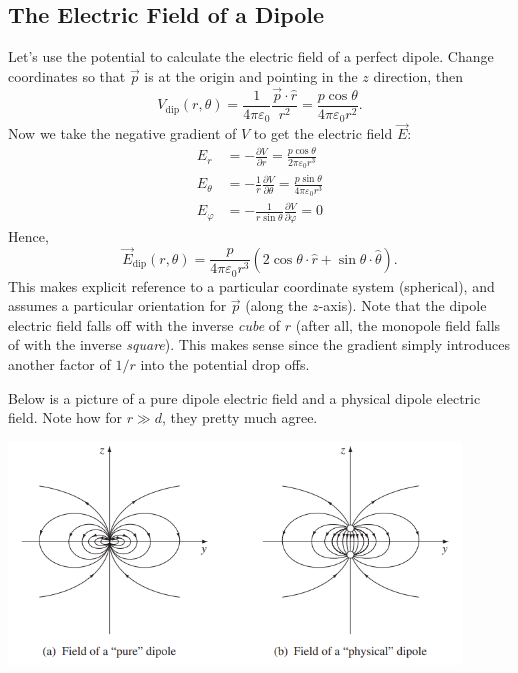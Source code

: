 \subsection{The Electric Field of a Dipole}

Let's use the potential to calculate the electric field of a perfect dipole. Change coordinates so that $\vec{p}$ is at the origin and pointing in the $z$ direction, then 
\[V_{\text{dip}}(r,\theta)=\frac{1}{4\pi\varepsilon_0}\frac{\vec{p}\cdot \hat{r}}{r^2}=\frac{p\cos\theta}{4\pi\varepsilon_0r^2}.\]
Now we take the negative gradient of $V$ to get the electric field $\vec{E}$:
\begin{align*}
    E_r&=-\frac{\partial V}{\partial r}=\frac{p\cos\theta}{2\pi\varepsilon_0r^3}\\
    E_\theta&=-\frac{1}{r}\frac{\partial V}{\partial\theta}=\frac{p\sin\theta}{4\pi\varepsilon_0 r^3}\\
    E_\varphi&=-\frac{1}{r\sin\theta}\frac{\partial V}{\partial \varphi}=0
\end{align*}
Hence,
\[\vec{E}_{\text{dip}}(r,\theta)=\frac{p}{4\pi\varepsilon_0r^3}(2\cos\theta \cdot\hat{r}+\sin\theta\cdot\hat{\theta}).\]
This makes explicit reference to a particular coordinate system (spherical), and assumes a particular orientation for $\vec{p}$ (along the $z$-axis). Note that the dipole electric field falls off with the inverse \textit{cube} of $r$ (after all, the monopole field falls of with the inverse \textit{square}). This makes sense since the gradient simply introduces another factor of $1/r$ into the potential drop offs. 

Below is a picture of a pure dipole electric field and a physical dipole electric field. Note how for $r\gg d$, they pretty much agree.

\begin{center}
    \includegraphics[width=12cm]{Electrodynamics/images/fig3.37.PNG}
\end{center}